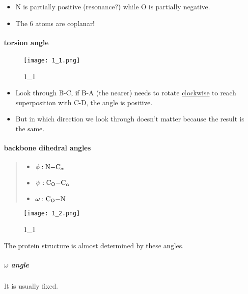\begin{itemize}
	\item
	N is partially positive (resonance?) while O is partially negative.
	\item
	The 6 atoms are coplanar!
\end{itemize}

\hypertarget{torsion-angle}{%
	\paragraph{torsion angle}\label{torsion-angle}}

\begin{figure}
	\centering
	\texttt{[image: 1\_1.png]}
	\caption{1\_1}
\end{figure}

\begin{itemize}
	\item
	Look through B-C, if B-A (the nearer) needs to rotate
	\underline{clockwise} to reach superposition with C-D, the angle is
	positive.
	\item
	But in which direction we look through doesn't matter because the
	result is \underline{the same}.
\end{itemize}

\hypertarget{backbone-dihedral-angles}{%
	\paragraph{backbone dihedral angles}\label{backbone-dihedral-angles}}

\begin{quote}
	\begin{itemize}
		\item
		\(\phi : \ce{N-C_{\alpha}}\)
		\item
		\(\psi : \ce{C_O-C_{\alpha}}\)
		\item
		\(\omega : \ce{C_O-N}\)
	\end{itemize}
\end{quote}

\begin{figure}
	\centering
	\texttt{[image: 1\_2.png]}
	\caption{1\_1}
\end{figure}

The protein structure is almost determined by these angles.

\hypertarget{angle}{%
	\subparagraph{\texorpdfstring{\(\omega\)
			angle}{\textbackslash{}omega angle}}\label{angle}}

It is usually fixed.

